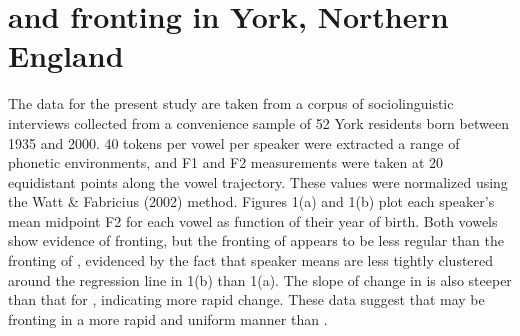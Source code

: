 \documentclass[PWPL]{article}
\begin{document}


\section{ and  fronting in York, Northern England}
The data for the present study are taken from a corpus of sociolinguistic interviews collected from a convenience sample of 52 York residents born between 1935 and 2000. 40 tokens per vowel per speaker were extracted a range of phonetic environments, and F1 and F2 measurements were taken at 20 equidistant points along the vowel trajectory. These values were normalized using the Watt \& Fabricius (2002) method. Figures 1(a) and 1(b) plot each speaker's mean midpoint F2 for each vowel as function of their year of birth. Both vowels show evidence of fronting, but the fronting of  appears to be less regular than the fronting of , evidenced by the fact that speaker means are less tightly clustered around the regression line in 1(b) than 1(a). The slope of change in  is also steeper than that for , indicating more rapid change. These data suggest that  may be fronting in a more rapid and uniform manner than .
\end{document}
